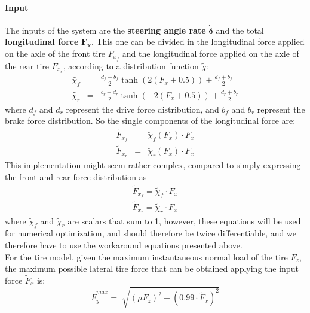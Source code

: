 \documentclass[a4paper, onecolumn, 11pt]{article}
\begin{document}
\paragraph*{Input}The inputs of the system are the \textbf{steering angle rate} $\mathbf{\dot{\delta}}$ and the
total \textbf{longitudinal force} $\mathbf{F_x}$. This one can be divided in the longitudinal
force applied on the axle of the front tire $F_{x_f}$ and the longitudinal force
applied on the axle of the rear tire $F_{x_r}$, according to a distribution
function $\tilde{\chi}$:
\begin{subequations}
    \begin{eqnarray}
        \tilde{\chi_f} &=& \frac{d_f - b_f}{2}\tanh(2(F_x+0.5))+\frac{d_f+b_f}{2} \\
        \tilde{\chi_r} &=& \frac{b_r-d_r}{2}\tanh(-2(F_x+0.5))+\frac{d_r+b_r}{2}
    \end{eqnarray}
\end{subequations}
where $d_f$ and $d_r$ represent the drive force distribution, and $b_f$ and $b_r$ represent the 
brake force distribution. So the single components of the longitudinal force are:
\begin{subequations}
    \begin{eqnarray}
        \tilde{F}_{x_f} &=& \tilde{\chi}_f(F_x) \cdot F_x \\
        \tilde{F}_{x_r} &=& \tilde{\chi}_r(F_x) \cdot F_x
    \end{eqnarray}
\end{subequations}
This implementation might seem rather complex, compared to simply expressing the front and rear force distribution as
\begin{subequations}
    \begin{eqnarray}
        \tilde{F}_{x_f} = \tilde{\chi}_f \cdot F_x \\
        \tilde{F}_{x_r} = \tilde{\chi}_r \cdot F_x
    \end{eqnarray}
\end{subequations}
where $\tilde{\chi}_f$ and $\tilde{\chi}_r$ are scalars that sum to 1, however, these equations will be used for numerical 
optimization, and should therefore be twice differentiable, and we therefore have to use the workaround equations presented above. \\
For the tire model, given the maximum instantaneous normal load of the tire $F_z$, the maximum possible
lateral tire force that can be obtained applying the input force $\tilde{F}_x$ is:
\begin{equation}
    \tilde{F}_y^{max} = \sqrt[]{(\mu F_z)^2 - (0.99\cdot \tilde{F}_x)^2}
\end{equation}
\end{document}
